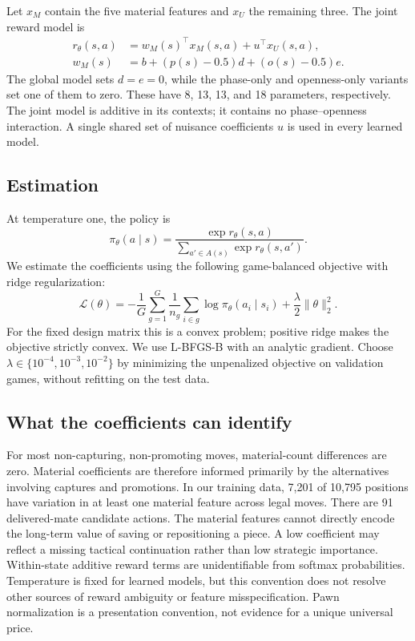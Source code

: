 \documentclass{jcst}
\begin{document}
Let $x_M$ contain the five material features and $x_U$ the remaining three. The joint reward model is
\begin{align}
r_\theta(s,a)&=w_M(s)^\top x_M(s,a)+u^\top x_U(s,a),\\
w_M(s)&=b+(p(s)-0.5)d+(o(s)-0.5)e.
\end{align}
The global model sets $d=e=0$, while the phase-only and openness-only variants set one of them to zero. These have 8, 13, 13, and 18 parameters, respectively. The joint model is additive in its contexts; it contains no phase--openness interaction. A single shared set of nuisance coefficients $u$ is used in every learned model.

\subsection{Estimation}
At temperature one, the policy is
\begin{equation}
\pi_\theta(a\mid s)=\frac{\exp r_\theta(s,a)}{\sum_{a'\in A(s)}\exp r_\theta(s,a')}.
\end{equation}
We estimate the coefficients using the following game-balanced objective with ridge regularization:
\begin{equation}
\mathcal L(\theta)=-\frac1G\sum_{g=1}^G\frac1{n_g}
\sum_{i\in g}\log\pi_\theta(a_i\mid s_i)+\frac\lambda2\|\theta\|_2^2.
\end{equation}
For the fixed design matrix this is a convex problem; positive ridge makes the objective strictly convex. We use L-BFGS-B with an analytic gradient. Choose $\lambda\in\{10^{-4},10^{-3},10^{-2}\}$ by minimizing the unpenalized objective on validation games, without refitting on the test data.

\subsection{What the coefficients can identify}
For most non-capturing, non-promoting moves, material-count differences are zero. Material coefficients are therefore informed primarily by the alternatives involving captures and promotions. In our training data, 7,201 of 10,795 positions have variation in at least one material feature across legal moves. There are 91 delivered-mate candidate actions. The material features cannot directly encode the long-term value of saving or repositioning a piece. A low coefficient may reflect a missing tactical continuation rather than low strategic importance. Within-state additive reward terms are unidentifiable from softmax probabilities. Temperature is fixed for learned models, but this convention does not resolve other sources of reward ambiguity or feature misspecification. Pawn normalization is a presentation convention, not evidence for a unique universal price.
\end{document}
